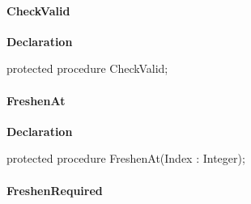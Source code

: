 \documentclass{report}
\newif\ifpdf
\begin{document}
\paragraph*{CheckValid}\hspace*{\fill}

\label{AbArcTyp.TAbArchive-CheckValid}
\begin{list}{}{
\setlength{\itemindent}{0cm}
\setlength{\listparindent}{0cm}
\setlength{\leftmargin}{\evensidemargin}
\addtolength{\leftmargin}{\tmplength}
\settowidth{\labelsep}{X}
\addtolength{\leftmargin}{\labelsep}
\setlength{\labelwidth}{\tmplength}
}
\item[\textbf{Declaration}\hfill]
\ifpdf
\begin{flushleft}
\fi
\begin{ttfamily}
protected procedure CheckValid;\end{ttfamily}

\ifpdf
\end{flushleft}
\fi

\end{list}
\paragraph*{FreshenAt}\hspace*{\fill}

\label{AbArcTyp.TAbArchive-FreshenAt}
\begin{list}{}{
\setlength{\itemindent}{0cm}
\setlength{\listparindent}{0cm}
\setlength{\leftmargin}{\evensidemargin}
\addtolength{\leftmargin}{\tmplength}
\settowidth{\labelsep}{X}
\addtolength{\leftmargin}{\labelsep}
\setlength{\labelwidth}{\tmplength}
}
\item[\textbf{Declaration}\hfill]
\ifpdf
\begin{flushleft}
\fi
\begin{ttfamily}
protected procedure FreshenAt(Index : Integer);\end{ttfamily}

\ifpdf
\end{flushleft}
\fi

\end{list}
\paragraph*{FreshenRequired}\hspace*{\fill}
\end{document}
